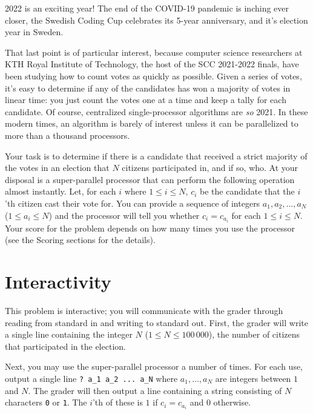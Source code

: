 2022 is an exciting year!
The end of the COVID-19 pandemic is inching ever closer, the Swedish Coding Cup celebrates its 5-year anniversary, and it's election year in Sweden.

That last point is of particular interest, because computer science researchers at KTH Royal Institute of Technology, the host of the SCC 2021-2022 finals, have been studying how to count votes as quickly as possible.
Given a series of votes, it's easy to determine if any of the candidates has won a majority of votes in linear time: you just count the votes one at a time and keep a tally for each candidate.
Of course, centralized single-processor algorithms are \emph{so} 2021.
In these modern times, an algorithm is barely of interest unless it can be parallelized to more than a thousand processors.

Your task is to determine if there is a candidate that received a strict majority of the votes in an election that $N$ citizens participated in, and if so, who.
At your disposal is a super-parallel processor that can perform the following operation almost instantly.
Let, for each $i$ where $1 \le i \le N$, $c_i$ be the candidate that the $i$'th citizen cast their vote for.
You can provide a sequence of integers $a_1, a_2, \dots, a_N$ ($1 \le a_i \le N$) and the processor will tell you whether $c_i = c_{a_i}$ for each $1 \le i \le N$.
Your score for the problem depends on how many times you use the processor (see the Scoring sections for the details).

\section*{Interactivity}
This problem is interactive; you will communicate with the grader through reading from standard in and writing to standard out.
First, the grader will write a single line containing the integer $N$ ($1 \le N \le 100\,000$), the number of citizens that participated in the election.

Next, you may use the super-parallel processor a number of times.
For each use, output a single line \texttt{? a\_1 a\_2 ... a\_N} where $a_1, \dots, a_N$ are integers between $1$ and $N$.
The grader will then output a line containing a string consisting of $N$ characters \texttt{0} or \texttt{1}.
The $i$'th of these is $1$ if $c_i = c_{a_i}$ and $0$ otherwise.

